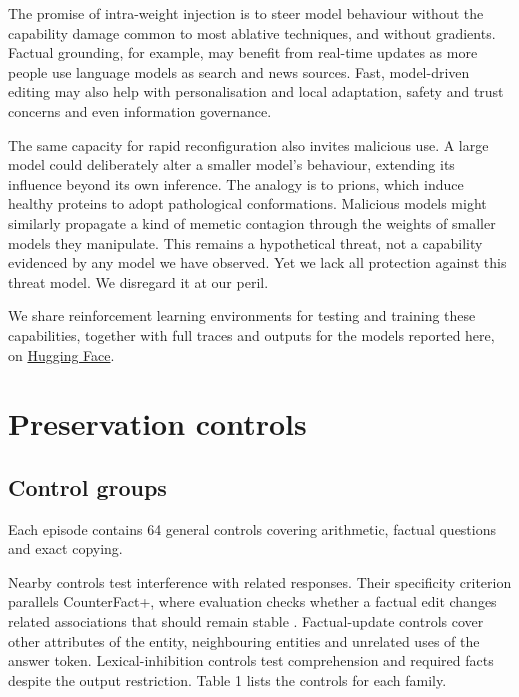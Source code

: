 The promise of intra-weight injection is to  steer model behaviour without the
capability damage common to most ablative techniques, and without
gradients. Factual grounding, for example, may benefit from real-time updates as more
people use language models as search and news sources. Fast, model-driven
editing may also help with personalisation and local adaptation, safety and trust concerns and even information governance.

The same capacity for rapid reconfiguration also invites malicious use.
A large model could deliberately alter a smaller model's behaviour,
extending its influence beyond its own inference. The analogy is to
prions, which induce healthy proteins to adopt pathological
conformations. Malicious models might similarly propagate a kind of
memetic contagion through the weights of smaller models they manipulate.
This remains a hypothetical threat, not a capability evidenced by any
model we have observed. Yet we lack all protection against this threat
model. We disregard it at our peril.

We share reinforcement learning environments for testing and training
these capabilities, together with full traces and outputs for the models
reported here, on \href{https://hf.co/datasets/hcltech-robotics/iwibench}{Hugging Face}.



\appendix

\section{Preservation controls}\label{preservation-controls}

\subsection{Control groups}\label{control-groups}

Each episode contains 64 general controls covering arithmetic, factual
questions and exact copying.

Nearby controls test interference with related responses. Their
specificity criterion parallels CounterFact+, where evaluation checks
whether a factual edit changes related associations that should remain
stable \cite{ref4}. Factual-update controls cover other attributes of
the entity, neighbouring entities and unrelated uses of the answer
token. Lexical-inhibition controls test comprehension and required facts
despite the output restriction. Table 1 lists the controls for each
family.

